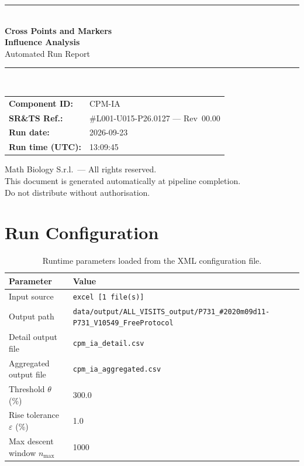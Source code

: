 \documentclass[a4paper,11pt]{article}
\begin{document}
\begin{titlepage}
\begin{center}
  \vspace*{1.8cm}
  {\color{dmaaccent}\rule{\linewidth}{1.5pt}}\\[0.6cm]
  {\LARGE\bfseries\color{dmaaccent}
    Cross Points and Markers\\[0.25cm]
    Influence Analysis}\\[0.4cm]
  {\Large Automated Run Report}\\[0.3cm]
  {\color{dmaaccent}\rule{\linewidth}{1.5pt}}\\[2cm]

  \begin{tabular}{ll}
    \textbf{Component ID:}   & CPM-IA \\[0.3cm]
    \textbf{SR\&TS Ref.:}    & \#L001-U015-P26.0127 --- Rev~00.00 \\[0.3cm]
    \textbf{Run date:}       & 2026-09-23 \\[0.3cm]
    \textbf{Run time (UTC):} & 13:09:45 \\
  \end{tabular}

  \vfill
  {\color{dmagray}\small
    Math Biology S.r.l.\ --- All rights reserved.\\
    This document is generated automatically at pipeline completion.\\
    Do not distribute without authorisation.}
\end{center}
\end{titlepage}

\tableofcontents
\clearpage

\section{Run Configuration}

\begin{table}[h!]
\centering
\small
\caption{Runtime parameters loaded from the XML configuration file.}
\begin{tabular}{ll}
\toprule
\textbf{Parameter} & \textbf{Value} \\
\midrule
Input source                      & \texttt{excel [1 file(s)]} \\
Output path                       & \texttt{data/output/ALL\_VISITS\_output/P731\_\#2020m09d11-P731\_V10549\_FreeProtocol} \\
Detail output file                & \texttt{cpm\_ia\_detail.csv} \\
Aggregated output file            & \texttt{cpm\_ia\_aggregated.csv} \\
Threshold $\theta$ (\%)           & 300.0 \\
Rise tolerance $\varepsilon$ (\%) & 1.0 \\
Max descent window $n_{\max}$     & 1000 \\
\bottomrule
\end{tabular}
\end{table}
\end{document}
